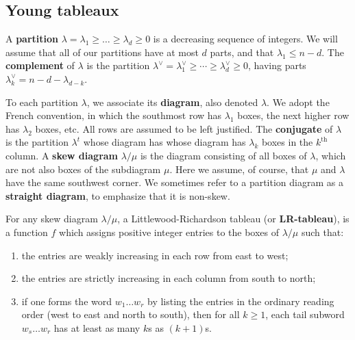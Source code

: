 \documentclass[12pt]{article}
\begin{document}
\subsection{Young tableaux}
\label{sec:tableaux}
A {\bf partition} $\lambda = \lambda_1 \geq \dots \geq \lambda_d \geq 0$ is a
decreasing sequence of integers.  We will assume that all of our partitions
have at most $d$ parts, and that $\lambda_1 \leq n-d$.
The {\bf complement} of $\lambda$ is the partition 
$\lambda^\vee = \lambda^\vee_1 \geq \cdots \geq \lambda^\vee_d \geq 0$, having
parts $\lambda^\vee_k = n-d -\lambda_{d-k}$.

To each partition $\lambda$, we associate
its {\bf diagram}, also denoted $\lambda$.  We adopt the French convention, 
in which the southmost row has $\lambda_1$ boxes, the next higher row 
has $\lambda_2$ boxes, etc.  All rows are assumed to be left justified.  
The {\bf conjugate} of $\lambda$ is the partition $\lambda^t$ whose
diagram has whose diagram has $\lambda_k$ boxes in the $k^\text{th}$ 
column.  A {\bf skew diagram} $\lambda/\mu$ is the diagram consisting of all 
boxes of $\lambda$, which are not also boxes of the subdiagram
$\mu$.  Here we assume,
of course, that $\mu$ and $\lambda$ have the same southwest corner.
We sometimes refer to a partition diagram as a {\bf straight diagram}, 
to emphasize that it is non-skew.


For any skew diagram $\lambda/\mu$, a Littlewood-Richardson tableau 
(or {\bf LR-tableau}),
is a function $f$ which assigns positive integer entries to the boxes 
of $\lambda/\mu$ such that:
\begin{enumerate} 
\item[(i)] the entries are weakly increasing in each row from east to west;
\item[(ii)] 
the entries are strictly increasing in each column from south to north;
\item[(iii)] 
if one forms the word $w_1\ldots w_r$ by listing the entries in
the ordinary reading order (west to east and north to south), then
for all $k \geq 1$, each tail subword $w_s\ldots w_r$ has at least as 
many $k$s as $(k{+}1)$s.
\end{enumerate}
\end{document}

